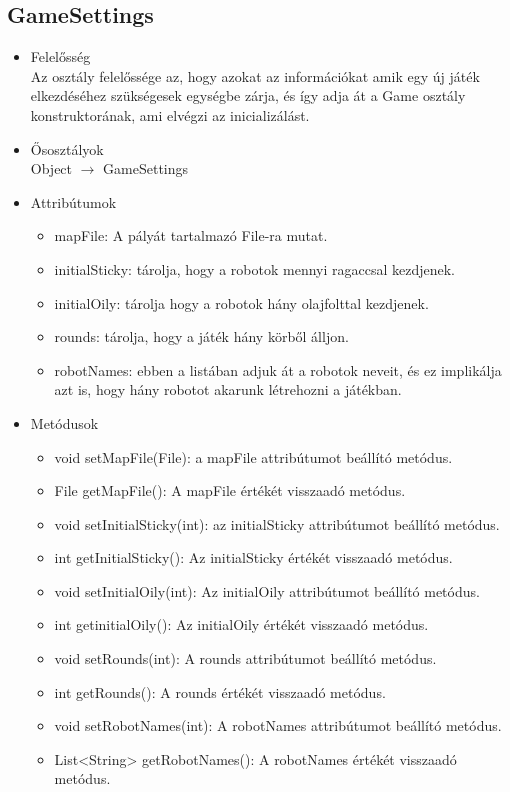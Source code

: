\subsection{GameSettings}
\begin{itemize}
	\item Felelősség\\
	Az osztály felelőssége az, hogy azokat az információkat amik egy új játék elkezdéséhez szükségesek egységbe zárja, és így adja át a Game osztály konstruktorának, ami elvégzi az inicializálást.
	\item Ősosztályok\\
		Object $\rightarrow$ GameSettings
	\item Attribútumok\\
	\begin{itemize}
		\item mapFile: A pályát tartalmazó File-ra mutat.
		\item initialSticky: tárolja, hogy a robotok mennyi ragaccsal kezdjenek.
		\item initialOily: tárolja hogy a robotok hány olajfolttal kezdjenek.
		\item rounds: tárolja, hogy a játék hány körből álljon.
		\item robotNames: ebben a listában adjuk át a robotok neveit, és ez implikálja azt is, hogy hány robotot akarunk létrehozni a játékban.
	\end{itemize}
	\item Metódusok\\
	\begin{itemize}
		\item void setMapFile(File): a mapFile attribútumot beállító metódus.
		\item File getMapFile(): A mapFile értékét visszaadó metódus.
		\item void setInitialSticky(int): az initialSticky attribútumot beállító metódus.
		\item int getInitialSticky(): Az initialSticky értékét visszaadó metódus.
		\item void setInitialOily(int): Az initialOily attribútumot beállító metódus.
		\item int getinitialOily(): Az initialOily értékét visszaadó metódus.
		\item void setRounds(int): A rounds attribútumot beállító metódus.
		\item int getRounds(): A rounds értékét visszaadó metódus.
		\item void setRobotNames(int): A robotNames attribútumot beállító metódus.
		\item List<String> getRobotNames(): A robotNames értékét visszaadó metódus.
	\end{itemize}
\end{itemize}


